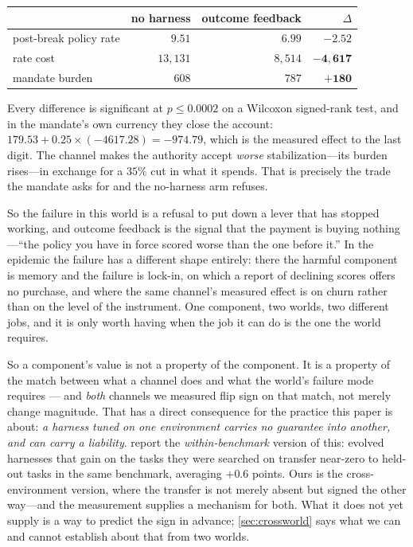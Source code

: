 \documentclass[11pt]{article}
\begin{document}
\begin{center}\small
\begin{tabular}{@{}lrrr@{}}
\toprule
 & no harness & outcome feedback & $\Delta$ \\
\midrule
post-break policy rate & $9.51$ & $6.99$ & $-2.52$ \\
rate cost & $13{,}131$ & $8{,}514$ & $\mathbf{-4{,}617}$ \\
mandate burden & $608$ & $787$ & $\mathbf{+180}$ \\
\bottomrule
\end{tabular}
\end{center}

Every difference is significant at $p \leq 0.0002$ on a Wilcoxon signed-rank test, and in the
mandate's own currency they close the account: $179.53 + 0.25 \times (-4617.28) = -974.79$, which is
the measured effect to the last digit. The channel makes the authority accept \emph{worse}
stabilization---its burden rises---in exchange for a $35\%$ cut in what it spends. That is precisely
the trade the mandate asks for and the no-harness arm refuses.

So the failure in this world is a refusal to put down a lever that has stopped working, and outcome
feedback is the signal that the payment is buying nothing---``the policy you have in force scored
worse than the one before it.'' In the epidemic the failure has a different shape entirely: there the
harmful component is memory and the failure is lock-in, on which a report of declining scores offers
no purchase, and where the same channel's measured effect is on churn rather than on the level of the
instrument. One component, two worlds, two different jobs, and it is only worth having when the job
it can do is the one the world requires.

So a component's value is not a property of the component. It is a property of the match between what
a channel does and what the world's failure mode requires --- and \emph{both} channels we measured
flip sign on that match, not merely change magnitude. That has a
direct consequence for the practice this paper is about: \emph{a harness tuned on one environment
carries no guarantee into another, and can carry a liability}. \citet{wang2026rethinking} report the
\emph{within-benchmark} version of this: evolved harnesses that gain on the tasks they were searched
on transfer near-zero to held-out tasks in the same benchmark, averaging $+0.6$ points. Ours is the
cross-environment version, where the transfer is not merely absent but signed the other way---and the
measurement supplies a mechanism for both. What it does not yet supply is a way to predict the sign
in advance; \cref{sec:crossworld} says what we can and cannot establish about that from two worlds.
\end{document}
